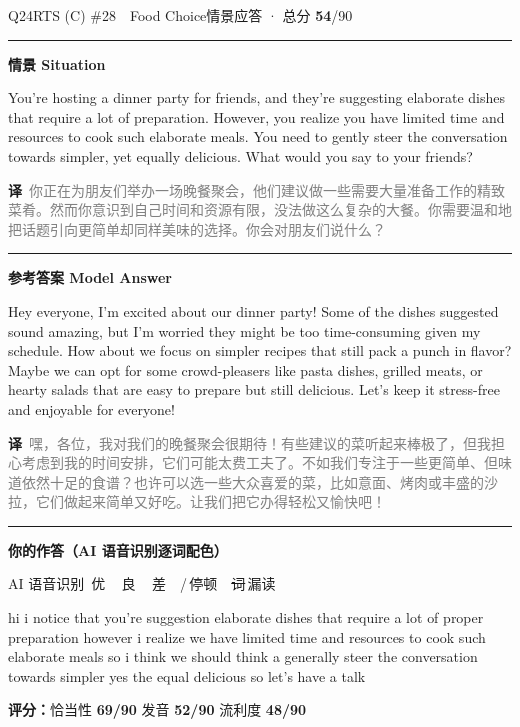 \documentclass[11pt]{article}
\newcommand{\sfull}[1]{\textcolor{cFix}{\bfseries #1}}     %
\newcommand{\spart}[1]{\textcolor{cPartial}{\bfseries #1}} %
\newcommand{\ptesub}[1]{%
  \par\needspace{2\baselineskip}\smallskip
  {\color{cAccent}\rule[-0.2ex]{3pt}{1.05em}}\hspace{6pt}%
  {\bfseries\color{cHead}#1}\par\nopagebreak\smallskip}
\newcommand{\sg}[1]{\textcolor{cSpkGood}{#1}}   %
\newcommand{\sy}[1]{\textcolor{cSpkOk}{#1}}     %
\newcommand{\sr}[1]{\textcolor{cSpkBad}{#1}}    %
\newcommand{\asrlegend}{{\footnotesize\color{gray}AI 语音识别\quad
  {\color{cSpkGood}\textbullet}\,优\ \ {\color{cSpkOk}\textbullet}\,良\ \
  {\color{cSpkBad}\textbullet}\,差\ \ {\color{gray}/}\,停顿\ \
  {\color{cSpkBad}\sout{词}}\,漏读}}
\newcommand{\zh}[1]{{\footnotesize\textcolor{cNote}{\textbf{译}}\ \textcolor{gray}{#1}}}
\begin{document}
\begin{qblock}{Q24\quad RTS (C) \#28\ \ Food Choice}{情景应答 · 总分 \textcolor{cAccent}{\bfseries 54}/90}
\ptesub{情景 Situation}
\begin{promptbox}
You're hosting a dinner party for friends, and they're suggesting elaborate dishes that require a lot of preparation. However, you realize you have limited time and resources to cook such elaborate meals. You need to gently steer the conversation towards simpler, yet equally delicious. What would you say to your friends?
\end{promptbox}
\zh{你正在为朋友们举办一场晚餐聚会，他们建议做一些需要大量准备工作的精致菜肴。然而你意识到自己时间和资源有限，没法做这么复杂的大餐。你需要温和地把话题引向更简单却同样美味的选择。你会对朋友们说什么？}
\ptesub{参考答案 Model Answer}
\begin{modelbox}
Hey everyone, I'm excited about our dinner party! Some of the dishes suggested sound amazing, but I'm worried they might be too time-consuming given my schedule. How about we focus on simpler recipes that still pack a punch in flavor? Maybe we can opt for some crowd-pleasers like pasta dishes, grilled meats, or hearty salads that are easy to prepare but still delicious. Let's keep it stress-free and enjoyable for everyone!
\end{modelbox}
\zh{嘿，各位，我对我们的晚餐聚会很期待！有些建议的菜听起来棒极了，但我担心考虑到我的时间安排，它们可能太费工夫了。不如我们专注于一些更简单、但味道依然十足的食谱？也许可以选一些大众喜爱的菜，比如意面、烤肉或丰盛的沙拉，它们做起来简单又好吃。让我们把它办得轻松又愉快吧！}
\ptesub{你的作答（AI 语音识别逐词配色）}
\asrlegend
\begin{asrbox}
\sy{hi} \sg{i} \sg{notice} \sy{that} \sg{you're} \sg{suggestion} \sy{elaborate} \sg{dishes} \sy{that} \sg{require} \sg{a} \sg{lot} \sg{of} \sy{proper} \sg{preparation} \sg{however} \sg{i} \sg{realize} \sg{we} \sg{have} \sy{limited} \sg{time} \sg{and} \sg{resources} \sg{to} \sg{cook} \sg{such} \sy{elaborate} \sg{meals} \sg{so} \sg{i} \sg{think} \sg{we} \sg{should} \sr{think} \sy{a} \sg{generally} \sr{steer} \sg{the} \sg{conversation} \sy{towards} \sg{simpler} \sg{yes} \sy{the} \sr{equal} \sg{delicious} \sg{so} \sg{let's} \sg{have} \sg{a} \sg{talk}
\end{asrbox}
\smallskip
{\small\textbf{评分：}恰当性 \sfull{69/90} \quad\textperiodcentered\quad 发音 \spart{52/90} \quad\textperiodcentered\quad 流利度 \spart{48/90}}
\end{qblock}
\end{document}

